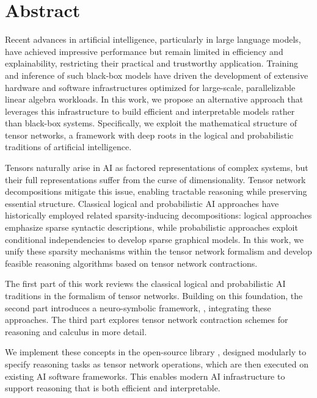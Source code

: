 \chapter{Abstract}


Recent advances in artificial intelligence, particularly in large language models, have achieved impressive performance but remain limited in efficiency and explainability, restricting their practical and trustworthy application.
Training and inference of such black-box models have driven the development of extensive hardware and software infrastructures optimized for large-scale, parallelizable linear algebra workloads.
In this work, we propose an alternative approach that leverages this infrastructure to build efficient and interpretable models rather than black-box systems.
Specifically, we exploit the mathematical structure of tensor networks, a framework with deep roots in the logical and probabilistic traditions of artificial intelligence.

Tensors naturally arise in AI as factored representations of complex systems, but their full representations suffer from the curse of dimensionality.
Tensor network decompositions mitigate this issue, enabling tractable reasoning while preserving essential structure.
Classical logical and probabilistic AI approaches have historically employed related sparsity-inducing decompositions: logical approaches emphasize sparse syntactic descriptions, while probabilistic approaches exploit conditional independencies to develop sparse graphical models.
In this work, we unify these sparsity mechanisms within the tensor network formalism and develop feasible reasoning algorithms based on tensor network contractions.

The first part of this work reviews the classical logical and probabilistic AI traditions in the formalism of tensor networks.
Building on this foundation, the second part introduces a neuro-symbolic framework, \HybridLogicNetworks{}, integrating these approaches.
The third part explores tensor network contraction schemes for reasoning and calculus in more detail.

We implement these concepts in the open-source \python{} library \tnreason{}, designed modularly to specify reasoning tasks as tensor network operations, which are then executed on existing AI software frameworks.
This enables modern AI infrastructure to support reasoning that is both efficient and interpretable.

